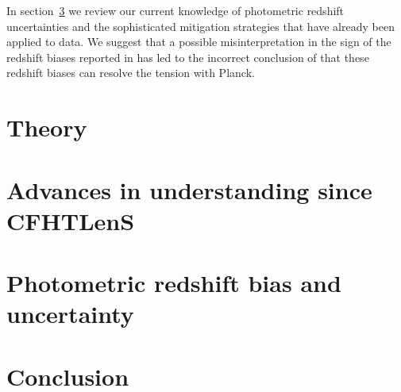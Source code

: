 \documentclass[a4paper, preprint, fleqn, usenatbib]{aastex}
\begin{document}
In section~\ref{sec:photoz} we review our current knowledge of photometric redshift uncertainties and the sophisticated mitigation strategies that have already been applied to data.  We suggest that a possible misinterpretation in the sign of the redshift biases reported in \citet{choi/etal:2016} has led to the incorrect conclusion of \citet{kitching/etal:2016} that these redshift biases can resolve the tension with Planck.  

\section{Theory}
\label{sec:theory}


\section{Advances in understanding since CFHTLenS}
\label{sec:cfhtlens}


\section{Photometric redshift bias and uncertainty}
\label{sec:photoz}


\section{Conclusion}
\label{sec:conclusion}




\end{document}
